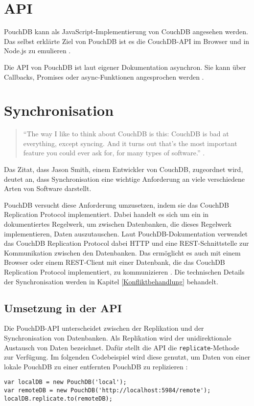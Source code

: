 \section{API}
\label{API}
PouchDB kann als JavaScript-Implementierung von CouchDB angesehen werden. Das selbst erklärte Ziel von PouchDB ist es die CouchDB-API im Browser und in Node.js zu emulieren \cite{pouch:intro}. 

Die API von PouchDB ist laut eigener Dokumentation asynchron. Sie kann über Callbacks, Promises oder async-Funktionen angesprochen werden \cite{pouch:api}.


\section{Synchronisation}
\label{Synchronisation}
\begin{citeenv}
\begin{quotation}
"`The way I like to think about CouchDB is this: CouchDB is bad at everything, except syncing. And it turns out that's the most important feature you could ever ask for, for many types of software."' \cite{pouch:replication}.
\end{quotation}
\end{citeenv}

Das Zitat, dass Jason Smith, einem Entwickler von CouchDB, zugeordnet wird, deutet an, dass Synchronisation eine wichtige Anforderung an viele verschiedene Arten von Software darstellt.

PouchDB versucht diese Anforderung umzusetzen, indem sie das CouchDB Replication Protocol implementiert. Dabei handelt es sich um ein in \cite{apache:replication} dokumentiertes Regelwerk, um zwischen Datenbanken, die dieses Regelwerk implementieren, Daten auszutauschen. Laut PouchDB-Dokumentation verwendet das CouchDB Replication Protocol dabei HTTP und eine REST-Schnittstelle zur Kommunikation zwischen den Datenbanken. Das ermöglicht es auch mit einem Browser oder einem REST-Client mit einer Datenbank, die das CouchDB Replication Protocol implementiert, zu kommunizieren \cite{pouch:intro}. Die technischen Details der Synchronisation werden in Kapitel \ref{Konfliktbehandlung} behandelt.


\subsection{Umsetzung in der API}
Die PouchDB-API unterscheidet zwischen der Replikation und der Synchronisation von Datenbanken. Als Replikation wird der unidirektionale Austausch von Daten bezeichnet. Dafür stellt die API die \texttt{replicate}-Methode zur Verfügung. Im folgenden Codebeispiel wird diese genutzt, um Daten von einer lokale PouchDB zu einer entfernten PouchDB zu replizieren \cite{pouch:replication}:
\begin{codebox}
\begin{lstlisting}[style=typescript]
var localDB = new PouchDB('local');
var remoteDB = new PouchDB('http://localhost:5984/remote');
localDB.replicate.to(remoteDB);
\end{lstlisting}
\end{codebox}


